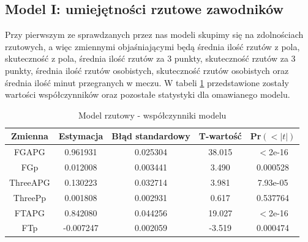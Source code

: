 \documentclass[11pt,a4paper]{article}
\begin{document}
\subsection{Model I: umiejętności rzutowe zawodników}
Przy pierwszym ze sprawdzanych przez nas modeli skupimy się na zdolnościach rzutowych, a więc zmiennymi objaśniającymi będą średnia ilość rzutów z pola, skuteczność z pola, średnia ilość rzutów za 3 punkty, skuteczność rzutów za 3 punkty, średnia ilość rzutów osobistych, skuteczność rzutów osobistych oraz średnia ilość minut przegranych w meczu. W tabeli \ref{offense} przedstawione zostały wartości współczynników oraz pozostałe statystyki dla omawianego modelu. 

\begin{table}[H]
	\begin{center}
	\begin{tabular}{| c | c | c | c | c |}
		\hline
		Zmienna & Estymacja & Błąd standardowy & T-wartość & Pr$(<|t|)$\\ \hline
		FGAPG & 0.961931 & 0.025304 & 38.015 & $<$2e-16\\ \hline
		FGp & 0.012008 & 0.003441 & 3.490 & 0.000528\\ \hline
		ThreeAPG & 0.130223 & 0.032714 & 3.981 & 7.93e-05\\ \hline 
		ThreePp & 0.001808 & 0.002931 & 0.617 & 0.537764\\ \hline
		FTAPG & 0.842080 & 0.044256 & 19.027 & $<$2e-16\\ \hline
		FTp  & -0.007247 & 0.002059 & -3.519 & 0.000474\\ \hline
	\end{tabular}
	\caption{Model rzutowy - współczynniki modelu}
	\label{offense}
	\end{center}
\end{table}
\end{document}
